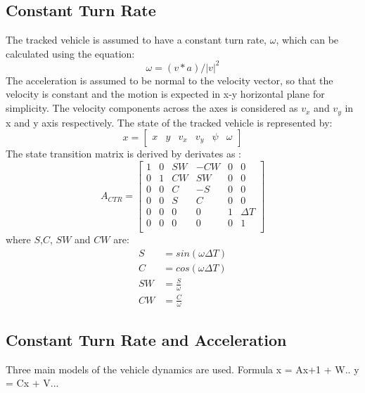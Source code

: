 \subsection{Constant Turn Rate}
The tracked vehicle is assumed to have a constant turn rate, $\omega$, which can be calculated using the equation:
\begin{equation*}
\omega = (v * a) / |v|^2
\end{equation*}
The acceleration is assumed to be normal to the velocity vector, so that the velocity is constant and the motion is expected in x-y horizontal plane for simplicity. The velocity components across the axes is considered as $v_x$ and $v_y$ in x and y axis respectively.
The state of the tracked vehicle is represented by:
\begin{equation*}
x = \left[
\begin{matrix}
x & y & v_x & v_y & \psi & \omega
\end{matrix}
\right]
\end{equation*}
The state transition matrix is derived by derivates as :
\begin{equation*}
A_{CTR} = \left[
\begin{matrix}
1 & 0 & SW & -CW & 0 & 0\\
0 & 1 & CW & SW & 0 & 0\\
0 & 0 & C & -S & 0 & 0\\
0 & 0 & S & C & 0 & 0\\
0 & 0 & 0 & 0 & 1 & \Delta T\\
0 & 0 & 0 & 0 & 0 & 1\\
\end{matrix}
\right]
\end{equation*}
where $S$,$C$, $SW$ and $CW$ are:
\begin{equation*}
\begin{split}
S &= sin(\omega \Delta T)\\
C &= cos(\omega \Delta T)\\
SW &= \frac{S}{\omega}\\
CW &= \frac{C}{\omega}
\end{split}
\end{equation*}
\subsection{Constant Turn Rate and Acceleration}
Three main models of the vehicle dynamics are used.
Formula x = Ax+1 + W..
y = Cx + V...
